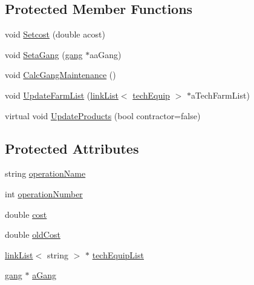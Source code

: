 \subsection*{Protected Member Functions}
\begin{DoxyCompactItemize}
\item 
void \hyperlink{classoperation_a7b792e8cf800cf57e5911bc9b88709fe}{Setcost} (double acost)
\item 
void \hyperlink{classoperation_ab3b3f3d4b1b02e1928e25704f49ba92d}{SetaGang} (\hyperlink{classgang}{gang} $\ast$aaGang)
\item 
void \hyperlink{classoperation_a073d712fe9226371dc494e21312eb5c9}{CalcGangMaintenance} ()
\item 
void \hyperlink{classoperation_a55df704ee7403e66bb470954a758bdac}{UpdateFarmList} (\hyperlink{classlink_list}{linkList}$<$ \hyperlink{classtech_equip}{techEquip} $>$ $\ast$aTechFarmList)
\item 
virtual void \hyperlink{classoperation_a3f18f5e71dd6bdfdf304ed1a24e7ac2f}{UpdateProducts} (bool contractor=false)
\end{DoxyCompactItemize}
\subsection*{Protected Attributes}
\begin{DoxyCompactItemize}
\item 
string \hyperlink{classoperation_ab4ae27405ba51acde05bd0b0a109edde}{operationName}
\item 
int \hyperlink{classoperation_a0dfdfa94be6ba40de784c3bf2be860f6}{operationNumber}
\item 
double \hyperlink{classoperation_a428131322ca543144396026161f70d51}{cost}
\item 
double \hyperlink{classoperation_abc0d99e0dba88ebc3d46fcb9fba77083}{oldCost}
\item 
\hyperlink{classlink_list}{linkList}$<$ string $>$ $\ast$ \hyperlink{classoperation_a4924dc23ecc7f5f2cdd46fd37a4477b2}{techEquipList}
\item 
\hyperlink{classgang}{gang} $\ast$ \hyperlink{classoperation_a5e8e50f58117ebd6c4706c7051dba7a5}{aGang}
\end{DoxyCompactItemize}


